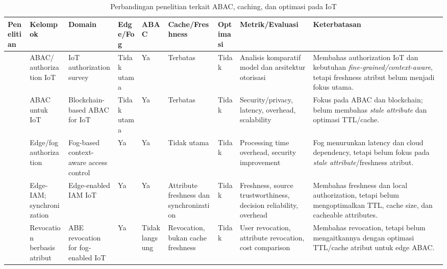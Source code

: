 \begin{landscape}
\begin{table}[H]
\centering
\scriptsize
\caption{Perbandingan penelitian terkait ABAC, caching, dan optimasi pada IoT}
\setlength{\tabcolsep}{2pt}
\renewcommand{\arraystretch}{1.25}

\begin{tabularx}{\linewidth}{|
L{2.4cm}|
L{2.1cm}|
L{2.2cm}|
L{1.2cm}|
L{1.2cm}|
L{2.4cm}|
L{2.0cm}|
L{2.8cm}|
Y|}
\hline
\textbf{Penelitian} &
\textbf{Kelompok} &
\textbf{Domain} &
\textbf{Edge/Fog} &
\textbf{ABAC} &
\textbf{Cache/Freshness} &
\textbf{Optimasi} &
\textbf{Metrik/Evaluasi} &
\textbf{Keterbatasan} \\ \hline

\textcite{diaz_authorization_2025}
& ABAC/ authorization IoT
& IoT authorization survey
& Tidak utama
& Ya
& Terbatas
& Tidak
& Analisis komparatif model dan arsitektur otorisasi
& Membahas authorization IoT dan kebutuhan \textit{fine-grained/context-aware}, tetapi freshness atribut belum menjadi fokus utama. \\ \hline

\textcite{ullah_survey_2023}
& ABAC untuk IoT
& Blockchain-based ABAC for IoT
& Tidak utama
& Ya
& Terbatas
& Tidak
& Security/privacy, latency, overhead, scalability
& Fokus pada ABAC dan blockchain; belum membahas \textit{stale attribute} dan optimasi TTL/cache. \\ \hline

\textcite{kalaria_adaptive_2024}
& Edge/fog authorization
& Fog-based context-aware access control
& Ya
& Ya
& Tidak utama
& Tidak
& Processing time overhead, security improvement
& Fog menurunkan latency dan cloud dependency, tetapi belum fokus pada \textit{stale attribute}/freshness atribut. \\ \hline

\textcite{wang_edge-enabled_2025}
& Edge-IAM; synchronization
& Edge-enabled IAM IoT
& Ya
& Ya
& Attribute freshness dan synchronization
& Tidak
& Freshness, source trustworthiness, decision reliability, overhead
& Membahas freshness dan local authorization, tetapi belum mengoptimalkan TTL, cache size, dan cacheable attributes. \\ \hline

\textcite{penuelas-angulo_revocation_2023}
& Revocation berbasis atribut
& ABE revocation for fog-enabled IoT
& Ya
& Tidak langsung
& Revocation, bukan cache freshness
& Tidak
& User revocation, attribute revocation, cost comparison
& Membahas revocation, tetapi belum mengaitkannya dengan optimasi TTL/cache atribut untuk edge ABAC. \\ \hline


\end{tabularx}
\end{table}
\end{landscape}
